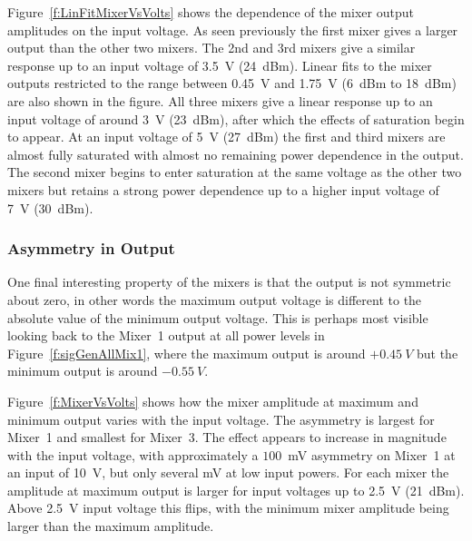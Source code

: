 Figure~\ref{f:LinFitMixerVsVolts} shows the dependence of the mixer output amplitudes on the input voltage. As seen previously the first mixer gives a larger output than the other two mixers. The 2nd and 3rd mixers give a similar response up to an input voltage of 3.5~V (24~dBm). 
Linear fits to the mixer outputs restricted to the range between 0.45~V and 1.75~V (6~dBm to 18~dBm) are also shown in the figure.
All three mixers give a linear response up to an input voltage of around 3~V (23~dBm), after which the effects of saturation begin to appear. At an input voltage of 5~V (27~dBm) the first and third mixers are almost fully saturated with almost no remaining power dependence in the output. The second mixer begins to enter saturation at the same voltage as the other two mixers but retains a strong power dependence up to a higher input voltage of 7~V (30~dBm).


\subsubsection{Asymmetry in Output}

One final interesting property of the mixers is that the output is not symmetric about zero, in other words the maximum output voltage is different to the absolute value of the minimum output voltage. This is perhaps most visible looking back to the Mixer~1 output at all power levels in Figure~\ref{f:sigGenAllMix1}, where the maximum output is around \(+0.45~V\) but the minimum output is around \(-0.55~V\).

Figure~\ref{f:MixerVsVolts} shows how the mixer amplitude at maximum and minimum output varies with the input voltage. The asymmetry is largest for Mixer~1 and smallest for Mixer~3. The effect appears to increase in magnitude with the input voltage, with approximately a \(100\)~mV asymmetry on Mixer~1 at an input of 10~V, but only several mV at low input powers. For each mixer the amplitude at maximum output is larger for input voltages up to 2.5~V (21~dBm). Above 2.5~V input voltage this flips, with the minimum mixer amplitude being larger than the maximum amplitude.


